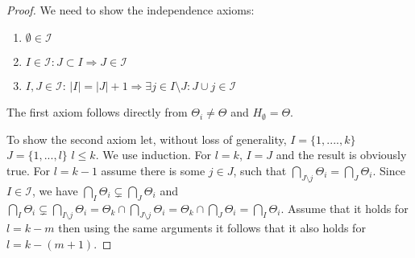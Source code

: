 \documentclass[a4paper,12pt]{article}
\begin{document}
\begin{proof}
  We need to show the independence axioms:
  \begin{enumerate}
  \item $\emptyset \in \mathscr{I}$
  \item $I  \in \mathscr{I}: J \subset I \Rightarrow J \in \mathscr{I}$
  \item $I,J \in \mathscr{I}$: $|I|=|J|+1 \Rightarrow \exists j \in
    I\setminus J: J \cup j \in \mathscr{I}$ 
  \end{enumerate}
  The first axiom follows directly from $\Theta_i \neq \Theta$ and
  $H_\emptyset = \Theta$. 

  To show the second axiom let, without loss of generality, $I =
  \{1,....,k\}$ $J = \{1,...,l\}$ $l \leq k$. We use induction. For $l
  = k$, $I = J$ and the result is obviously true. For $l = k-1$ assume
  there is some $j \in J$, such that $\bigcap_{J \setminus j} \Theta_i
  = \bigcap_{J} \Theta_i$. Since $I \in \mathscr{I}$, we have
  $\bigcap_{I} \Theta_i \subsetneq \bigcap_{J} \Theta_i$ and
  $\bigcap_I \Theta_i \subsetneq \bigcap_{I \setminus j} \Theta_i =
  \Theta_k \cap \bigcap_{J \setminus j} \Theta_i= \Theta_k \cap \bigcap_{J}
  \Theta_i= \bigcap_I \Theta_i$. Assume that it holds for $l = k - m$
  then using the same arguments it follows that it also holds for $l =
  k - (m + 1)$.


\end{proof}
\end{document}
